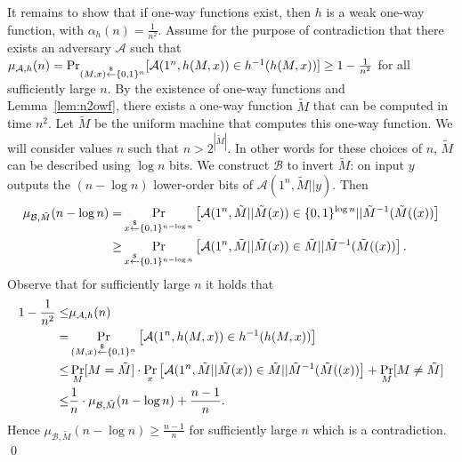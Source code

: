 \documentclass[12pt]{tufte-book}
\begin{document}
It remains to show that if one-way functions exist, then $h$ is a weak one-way function, with $\alpha_h(n) = \frac{1}{n^2}$.
Assume for the purpose of contradiction that there exists an adversary $\mathcal{A}$ such that $\mu_{\mathcal{A},h}(n) = \Pr_{(M,x) \stackrel{\$}{\leftarrow} \{0,1\}^{n}}[ \mathcal{A}(1^{n}, h(M,x)) \in h^{-1}(h(M,x))]\geq 1-\frac{1}{n^2}$ for all sufficiently large $n$.
By the existence of one-way functions and Lemma~\ref{lem:n2owf}, there exists a one-way function $\tilde M$ that can be computed in time $n^2$. Let $\tilde M$ be the uniform machine that computes this one-way function.
We will consider values $n$ such that $n > 2^{|\tilde M|}$. In other words for these choices of $n$, $\tilde M$ can be described using $\log n$ bits.
We construct $\mathcal{B}$ to invert $\tilde M$: on input $y$ outputs the $(n-\log n)$ lower-order bits of $\mathcal{A}(1^n, \tilde M||y)$. Then
\begin{align*}
\mu_{\mathcal{B},\tilde M}(n-\log n) =& \Pr_{x \stackrel{\$}{\leftarrow} \{0,1\}^{n-\log n}}\left[\mathcal{A}(1^{n}, \tilde M || \tilde M(x)) \in \{0,1\}^{\log n} || \tilde M^{-1}(\tilde M((x))\right]\\
\geq& \Pr_{x \stackrel{\$}{\leftarrow} \{0,1\}^{n-\log n}}\left[\mathcal{A}(1^{n}, \tilde M || \tilde M(x)) \in \tilde{M} || \tilde M^{-1}(\tilde M((x))\right].
\end{align*}
Observe that for sufficiently large $n$ it holds that
\begin{align*}
1-\frac{1}{n^2} \leq& \mu_{\mathcal{A},h}(n)\\
=& \Pr_{(M,x) \stackrel{\$}{\leftarrow} \{0,1\}^{n}}\left[ \mathcal{A}(1^{n}, h(M,x)) \in h^{-1}(h(M,x))\right]\\
\leq& \Pr_{M }[M = \tilde M] \cdot \Pr_{x }\left[ \mathcal{A}(1^{n}, \tilde M||\tilde M(x)) \in  \tilde{M} || \tilde M^{-1}(\tilde M((x))\right] + \Pr_{M }[M \neq \tilde M]  \\
\leq&  \frac{1}{n} \cdot \mu_{\mathcal{B},\tilde M}(n-\log n) +\frac{n-1}{n}.
\end{align*}
Hence $\mu_{\mathcal{B},\tilde M}(n-\log n) \geq \frac{n-1}{n}$  for sufficiently large $n$ which is a contradiction.
\qed
\end{document}
